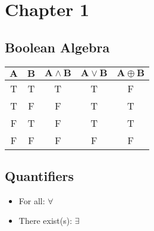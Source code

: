 \documentclass{article}
\begin{document}
\newcommand{\hr}{\par\noindent\rule{\textwidth}{0.4pt}}

\newcommand{\bc}[1]{
	\begin{equation*}
		\begin{boxed}
			{#1}
		\end{boxed}
	\end{equation*}
}

\newcommand{\cond}[2]{
	\ifmmode
		{#1} \quad {#2}
	\else
		$$ {#1} \quad {#2} $$
	\fi
}

\newcommand{\matr}[1]{
	\ifmmode \bm{#1}
	\else \textit{\textbf{#1}}
	\fi
}
\newcommand{\vect}[1]{
	\ifmmode \mathbf{#1}
	\else \textbf{#1}
	\fi
}


\tableofcontents

\section{Chapter 1}

\subsection{Boolean Algebra}

\begin{tabular}{ | c | c | c | c | c | }
	$ \mathbf{A} $ & $ \mathbf{B} $ & $ \mathbf{A \land B} $ & $ \mathbf{A \lor B} $  & $ \mathbf{A \oplus B} $ \\
	\hline
	T & T & T & T & F \\
	T & F & F & T & T \\
	F & T & F & T & T \\
	F & F & F & F & F
\end{tabular}

\subsection{Quantifiers}

\begin{itemize}
	\item
		For all: $ \forall $
	\item
		There exist(s): $ \exists $
\end{itemize}
\end{document}
